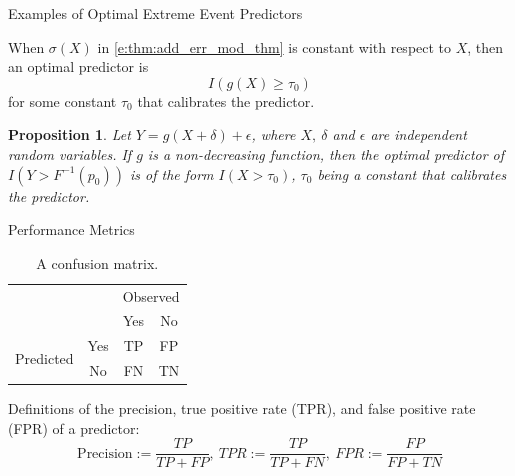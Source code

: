 \documentclass{beamer}
\newtheorem{proposition}{Proposition}
\begin{document}
\begin{frame}{Examples of Optimal Extreme Event Predictors}
    \begin{corollary}
        When $\sigma(X)$ in \eqref{e:thm:add_err_mod_thm} is constant with respect to $X$, then an optimal predictor is
        \[
        I(g(X) \ge \tau_0)
        \]
        for some constant $\tau_0$ that calibrates the predictor.
    \end{corollary}

    \begin{proposition} \label{p:monotone-link}
        Let $Y = g(X + \delta) + \epsilon$, where $X,\ \delta$ and $\epsilon$ are independent random
        variables. If $g$ is a non-decreasing function, then the optimal predictor of $I(Y > F^{-1}(p_0))$ is of the form $I(X > \tau_0)$, $\tau_0$ being a constant that calibrates the predictor.
    \end{proposition}
\end{frame}

\begin{frame}{Performance Metrics}
    \begin{table}[h]
        \centering
        \begin{tabular}{@{}cc|cc@{}}
            \multicolumn{1}{c}{} &\multicolumn{1}{c}{} &\multicolumn{2}{c}{Observed} \\ 
            \multicolumn{1}{c}{} & 
            \multicolumn{1}{c|}{} & 
            \multicolumn{1}{c}{Yes} & 
            \multicolumn{1}{c}{No} \\ 
            \cline{2-4}
            \multirow[c]{2}{*}{Predicted} %
            & Yes  & TP & FP   \\[1.5ex]
            & No  & FN   & TN \\ 
            \cline{2-4}
        \end{tabular}
        \caption{A confusion matrix.}
        \label{tab:conf_mat}
    \end{table}
    Definitions of the precision, true positive rate (TPR), and false positive rate (FPR) of a predictor:
    \[
    \text{Precision} := \frac{TP}{TP + FP}, \
    TPR := \frac{TP}{TP + FN}, \
    FPR := \frac{FP}{FP + TN}
    \]
\end{frame}
\end{document}
